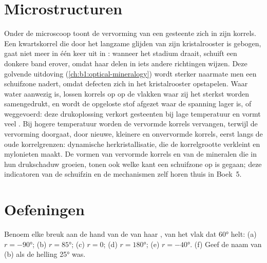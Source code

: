 \begin{omfigure}
\label{fig:b1:faults-folds-fabrics:vergence}
\end{omfigure}

\section{Microstructuren}\label{sec:b1:faults-folds-fabrics:micro}

Onder de microscoop toont de vervorming van een gesteente zich in zijn korrels. Een kwartskorrel die door het langzame glijden van zijn kristalrooster is gebogen, gaat niet meer in één keer uit in : wanneer het stadium draait, schuift een donkere band erover, omdat haar delen in iets andere richtingen wijzen. Deze golvende uitdoving (\cref{ch:b1:optical-mineralogy}) wordt sterker naarmate men een schuifzone nadert, omdat defecten zich in het kristalrooster opstapelen. Waar water aanwezig is, lossen korrels op op de vlakken waar zij het sterkst worden samengedrukt, en wordt de opgeloste stof afgezet waar de spanning lager is, of weggevoerd: deze drukoplossing verkort gesteenten bij lage temperatuur en vormt veel . Bij hogere temperatuur worden de vervormde korrels vervangen, terwijl de vervorming doorgaat, door nieuwe, kleinere en onvervormde korrels, eerst langs de oude korrelgrenzen: dynamische herkristallisatie, die de korrelgrootte verkleint en mylonieten maakt. De vormen van vervormde korrels en van de mineralen die in hun drukschaduw groeien, tonen ook welke kant een schuifzone op is gegaan; deze indicatoren van de schuifzin en de mechanismen zelf horen thuis in Boek~5.

\section{Oefeningen}

\begin{exercise}[$\star$]\label{exo:b1:faults-folds-fabrics:1}
Benoem elke breuk aan de hand van de  van haar , van het vlak dat \ang{60} helt:
(a) $r = \ang{-90}$; (b) $r = \ang{85}$; (c) $r = 0$; (d) $r = \ang{180}$;
(e) $r = \ang{-40}$. (f) Geef de naam van (b) als de helling \ang{25} was.
\end{exercise}

